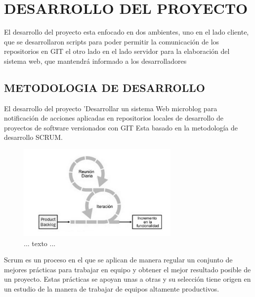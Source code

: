 

%
\chapter{DESARROLLO DEL PROYECTO}
El desarrollo del proyecto esta enfocado en dos ambientes, uno en el lado cliente, que se desarrollaron scripts para poder permitir la comunicación de los repositorios en GIT
el otro lado en el lado servidor para la elaboración del sistema web, que mantendrá informado a los desarrolladores
\section{METODOLOGIA DE DESARROLLO}
El desarrollo del proyecto 'Desarrollar un sistema Web microblog para notificación de acciones aplicadas en repositorios locales de desarrollo de proyectos de software versionados con GIT Esta basado en la metodología de desarrollo SCRUM.

\begin{figure}[htb]
\centering
\includegraphics[width=0.7\textwidth]{imagenes/image-0.png}%
\caption{... texto ...}
\label{contexto:figura}
\end{figure}

Scrum es un proceso en el que se aplican de manera regular un conjunto de mejores prácticas para trabajar en equipo y obtener el mejor resultado posible de un proyecto. Estas prácticas se apoyan unas a otras y su selección tiene origen en un estudio de la manera de trabajar de equipos altamente productivos.

